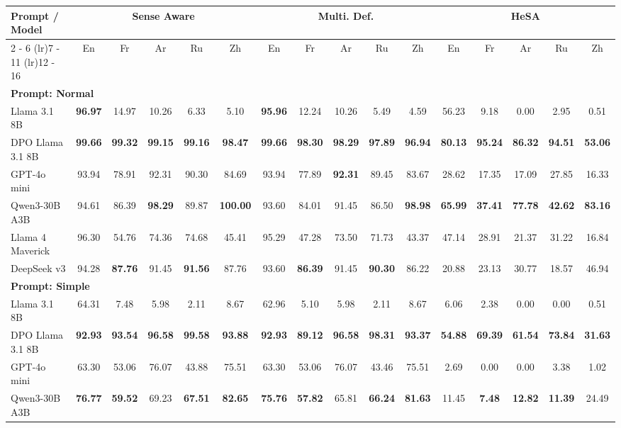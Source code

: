\documentclass{article}%
\begin{document}
%
\normalsize%


\begin{table}[h!]%
\centering%
\small%
\setlength{\tabcolsep}{4pt}%
\begin{tabular}{@{}lccccccccccccccc@{}}%
\toprule%
\textbf{Prompt / Model} & \multicolumn{5}{c}{\textbf{Sense Aware}} & \multicolumn{5}{c}{\textbf{Multi. Def.}} & \multicolumn{5}{c}{\textbf{HeSA}} \\%
\cmidrule(lr){2%
-%
6}%
\cmidrule(lr){7%
-%
11}%
\cmidrule(lr){12%
-%
16}%
&En&Fr&Ar&Ru&Zh&En&Fr&Ar&Ru&Zh&En&Fr&Ar&Ru&Zh\\%
\midrule%
\multicolumn{16}{l}{\textbf{Prompt: Normal}} \\%
Llama 3.1 8B&\textbf{96.97}&14.97&10.26&6.33&5.10&\textbf{95.96}&12.24&10.26&5.49&4.59&56.23&9.18&0.00&2.95&0.51\\%
DPO Llama 3.1 8B&\textbf{99.66}&\textbf{99.32}&\textbf{99.15}&\textbf{99.16}&\textbf{98.47}&\textbf{99.66}&\textbf{98.30}&\textbf{98.29}&\textbf{97.89}&\textbf{96.94}&\textbf{80.13}&\textbf{95.24}&\textbf{86.32}&\textbf{94.51}&\textbf{53.06}\\%
GPT{-}4o mini&93.94&78.91&92.31&90.30&84.69&93.94&77.89&\textbf{92.31}&89.45&83.67&28.62&17.35&17.09&27.85&16.33\\%
Qwen3{-}30B A3B&94.61&86.39&\textbf{98.29}&89.87&\textbf{100.00}&93.60&84.01&91.45&86.50&\textbf{98.98}&\textbf{65.99}&\textbf{37.41}&\textbf{77.78}&\textbf{42.62}&\textbf{83.16}\\%
Llama 4 Maverick&96.30&54.76&74.36&74.68&45.41&95.29&47.28&73.50&71.73&43.37&47.14&28.91&21.37&31.22&16.84\\%
DeepSeek v3&94.28&\textbf{87.76}&91.45&\textbf{91.56}&87.76&93.60&\textbf{86.39}&91.45&\textbf{90.30}&86.22&20.88&23.13&30.77&18.57&46.94\\%
\midrule%
\multicolumn{16}{l}{\textbf{Prompt: Simple}} \\%
Llama 3.1 8B&64.31&7.48&5.98&2.11&8.67&62.96&5.10&5.98&2.11&8.67&6.06&2.38&0.00&0.00&0.51\\%
DPO Llama 3.1 8B&\textbf{92.93}&\textbf{93.54}&\textbf{96.58}&\textbf{99.58}&\textbf{93.88}&\textbf{92.93}&\textbf{89.12}&\textbf{96.58}&\textbf{98.31}&\textbf{93.37}&\textbf{54.88}&\textbf{69.39}&\textbf{61.54}&\textbf{73.84}&\textbf{31.63}\\%
GPT{-}4o mini&63.30&53.06&76.07&43.88&75.51&63.30&53.06&76.07&43.46&75.51&2.69&0.00&0.00&3.38&1.02\\%
Qwen3{-}30B A3B&\textbf{76.77}&\textbf{59.52}&69.23&\textbf{67.51}&\textbf{82.65}&\textbf{75.76}&\textbf{57.82}&65.81&\textbf{66.24}&\textbf{81.63}&11.45&\textbf{7.48}&\textbf{12.82}&\textbf{11.39}&24.49\\%

\end{tabular}
\end{table}
\end{document}

